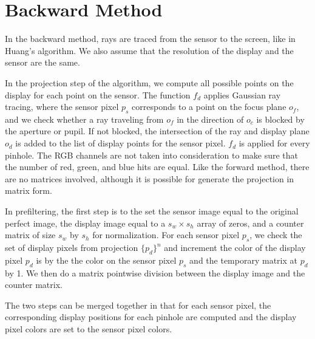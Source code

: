\section{Backward Method}

In the backward method, rays are traced from the sensor to the screen, like in Huang's algorithm. We also assume that the resolution of the display and the sensor are the same. 

In the projection step of the algorithm, we compute all possible points on the display for each point on the sensor. The function $f_d$ applies Gaussian ray tracing, where the sensor pixel $p_s$ corresponds to a point on the focus plane $o_f$, and we check whether a ray traveling from $o_f$ in the direction of $o_c$ is blocked by the aperture or pupil. If not blocked, the intersection of the ray and display plane $o_d$ is added to the list of display points for the sensor pixel. $f_d$ is applied for every pinhole. The RGB channels are not taken into consideration to make sure that the number of red, green, and blue hits are equal. Like the forward method, there are no matrices involved, although it is possible for generate the projection in matrix form.   

In prefiltering, the first step is to the set the sensor image equal to the original perfect image, the display image equal to a $s_w \times s_h$ array of zeros, and a counter matrix of size $s_w$ by $s_h$ for normalization. For each sensor pixel $p_s$, we check the set of display pixels from projection $\{p_d\}^n$ and increment the color of the display pixel $p_d$ is by the the color on the sensor pixel $p_s$ and the temporary matrix at $p_d$ by 1. We then do a matrix pointwise division between the display image and the counter matrix.

The two steps can be merged together in that for each sensor pixel, the corresponding display positions for each pinhole are computed and the display pixel colors are set to the sensor pixel colors. 

